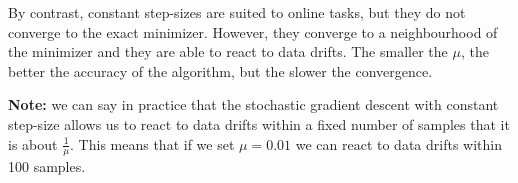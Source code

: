 By contrast, constant step-sizes are suited to online tasks, but they do not converge to the exact minimizer. However, they converge to a neighbourhood of the minimizer and they are able to react to data drifts. The smaller the $\mu$, the better the accuracy of the algorithm, but the slower the convergence.

\textbf{Note:} we can say in practice that the stochastic gradient descent with constant step-size allows us to react to data drifts within a fixed number of samples that it is about $\frac{1}{\mu}$. This means that if we set $\mu = 0.01$ we can react to data drifts within 100 samples.